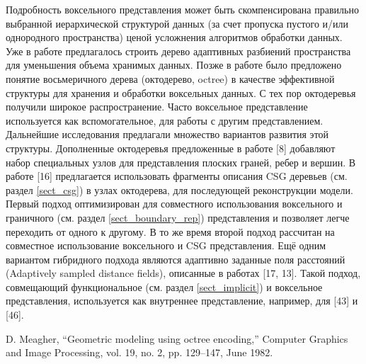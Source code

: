 Подробность воксельного представления может быть скомпенсирована правильно выбранной иерархической структурой данных (за счет пропуска пустого и/или однородного пространства) ценой усложнения алгоритмов обработки данных. Уже в работе \cite{REDD78} предлагалось строить дерево адаптивных разбиений пространства для уменьшения объема хранимых данных. Позже в работе \cite{Meagher82} было предложено понятие восьмеричного дерева (октодерево, octree) в качестве эффективной структуры для хранения и обработки воксельных данных. С тех пор октодеревья получили широкое распространение. Часто воксельное представление используется как вспомогательное, для работы с другим представлением. Дальнейшие исследования предлагали множество вариантов развития этой структуры. Дополненные октодеревья предложенные в работе [8] добавляют набор специальных узлов для представления плоских граней, ребер и вершин. В работе [16] предлагается использовать фрагменты описания CSG деревьев (см. раздел \ref{sect_csg}) в узлах октодерева, для последующей реконструкции модели. Первый подход оптимизирован для совместного использования воксельного и граничного (см. раздел \ref{sect_boundary_rep}) представления и позволяет легче переходить от одного к другому. В то же время второй подход рассчитан на совместное использование воксельного и CSG представления. Ещё одним вариантом гибридного подхода являются адаптивно заданные поля расстояний (Adaptively sampled distance fields), описанные в работах [17, 13]. Такой подход, совмещающий функциональное (см. раздел \ref{sect_implicit}) и воксельное представления, используется как внутреннее представление, например, для  [43] и  [46].

D. Meagher, “Geometric modeling using octree encoding,” Computer Graphics
and Image Processing, vol. 19, no. 2, pp. 129–147, June 1982.

